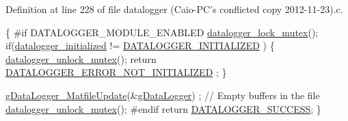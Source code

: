 Definition at line 228 of file datalogger (\-Caio-\/\-P\-C's conflicted copy 2012-\/11-\/23).\-c.


\begin{DoxyCode}
\{
\textcolor{preprocessor}{    #if DATALOGGER\_MODULE\_ENABLED}
\textcolor{preprocessor}{}    \hyperlink{datalogger_01_07Caio-PC's_01conflicted_01copy_012012-11-23_08_8c_a54b06d9395b2e370a5a72beb7f9524b2}{datalogger\_lock\_mutex}();
    \textcolor{keywordflow}{if}(\hyperlink{datalogger_01_07Caio-PC's_01conflicted_01copy_012012-11-23_08_8c_a35e8fbe04b90452afdc3c1be16ff6187}{datalogger\_initialized} != \hyperlink{datalogger_01_07Caio-PC's_01conflicted_01copy_012012-11-23_08_8h_a684c343d340004b77ca2b782934c96ca}{DATALOGGER\_INITIALIZED}
      )
    \{
        \hyperlink{datalogger_01_07Caio-PC's_01conflicted_01copy_012012-11-23_08_8c_a85453211c0c809083c36cc56b275aeeb}{datalogger\_unlock\_mutex}();
        \textcolor{keywordflow}{return} \hyperlink{datalogger_01_07Caio-PC's_01conflicted_01copy_012012-11-23_08_8h_a60df7fe0e61b757ad6a9db106b0eb43e}{DATALOGGER\_ERROR\_NOT\_INITIALIZED}
      ;
    \}

    \hyperlink{gdatalogger_8c_a05dc8ce832b941280d7de26057992640}{gDataLogger\_MatfileUpdate}(&\hyperlink{datalogger_01_07Caio-PC's_01conflicted_01copy_012012-11-23_08_8c_abe3b9c2c4e21e79c7b046b5986d13acc}{gDataLogger})
      ; \textcolor{comment}{// Empty buffers in the file}
    \hyperlink{datalogger_01_07Caio-PC's_01conflicted_01copy_012012-11-23_08_8c_a85453211c0c809083c36cc56b275aeeb}{datalogger\_unlock\_mutex}();
\textcolor{preprocessor}{    #endif}
\textcolor{preprocessor}{}
    \textcolor{keywordflow}{return} \hyperlink{datalogger_01_07Caio-PC's_01conflicted_01copy_012012-11-23_08_8h_abddebaf71d26d40183fccbb1a766b983}{DATALOGGER\_SUCCESS};
\}
\end{DoxyCode}
